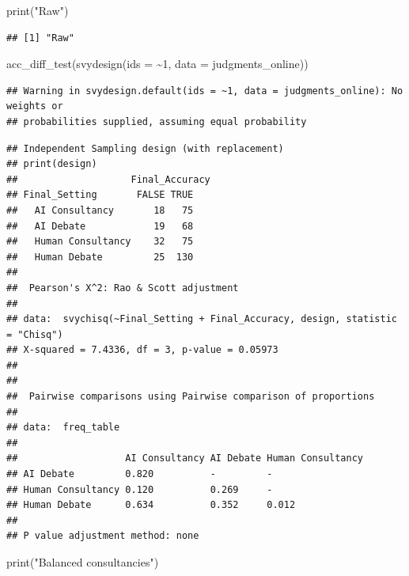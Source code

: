 \documentclass[
]{article}
\newenvironment{Shaded}{\begin{snugshade}}{\end{snugshade}}
\newcommand{\AttributeTok}[1]{\textcolor[rgb]{0.77,0.63,0.00}{#1}}
\newcommand{\DecValTok}[1]{\textcolor[rgb]{0.00,0.00,0.81}{#1}}
\newcommand{\FunctionTok}[1]{\textcolor[rgb]{0.00,0.00,0.00}{#1}}
\newcommand{\NormalTok}[1]{#1}
\newcommand{\SpecialCharTok}[1]{\textcolor[rgb]{0.00,0.00,0.00}{#1}}
\newcommand{\StringTok}[1]{\textcolor[rgb]{0.31,0.60,0.02}{#1}}
\begin{document}
\begin{Shaded}
\begin{Highlighting}[]
\FunctionTok{print}\NormalTok{(}\StringTok{"Raw"}\NormalTok{)}
\end{Highlighting}
\end{Shaded}

\begin{verbatim}
## [1] "Raw"
\end{verbatim}

\begin{Shaded}
\begin{Highlighting}[]
\FunctionTok{acc\_diff\_test}\NormalTok{(}\FunctionTok{svydesign}\NormalTok{(}\AttributeTok{ids =} \SpecialCharTok{\textasciitilde{}}\DecValTok{1}\NormalTok{, }\AttributeTok{data =}\NormalTok{ judgments\_online))}
\end{Highlighting}
\end{Shaded}

\begin{verbatim}
## Warning in svydesign.default(ids = ~1, data = judgments_online): No weights or
## probabilities supplied, assuming equal probability
\end{verbatim}

\begin{verbatim}
## Independent Sampling design (with replacement)
## print(design)
##                    Final_Accuracy
## Final_Setting       FALSE TRUE
##   AI Consultancy       18   75
##   AI Debate            19   68
##   Human Consultancy    32   75
##   Human Debate         25  130
## 
##  Pearson's X^2: Rao & Scott adjustment
## 
## data:  svychisq(~Final_Setting + Final_Accuracy, design, statistic = "Chisq")
## X-squared = 7.4336, df = 3, p-value = 0.05973
## 
## 
##  Pairwise comparisons using Pairwise comparison of proportions 
## 
## data:  freq_table 
## 
##                   AI Consultancy AI Debate Human Consultancy
## AI Debate         0.820          -         -                
## Human Consultancy 0.120          0.269     -                
## Human Debate      0.634          0.352     0.012            
## 
## P value adjustment method: none
\end{verbatim}

\begin{Shaded}
\begin{Highlighting}[]
\FunctionTok{print}\NormalTok{(}\StringTok{"Balanced consultancies"}\NormalTok{)}
\end{Highlighting}
\end{Shaded}
\end{document}
